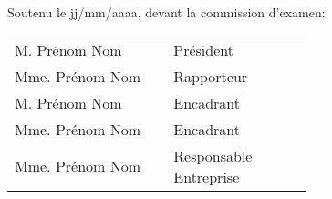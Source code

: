 \begin{titlepage}
\begin{center}
\vspace{40pt}
Soutenu le jj/mm/aaaa, devant la commission d'examen:\\
\vspace{20pt}
\begin{tabular}{p{0.35\linewidth} p{0.3\linewidth}}
  M. Prénom Nom & Président \\
  Mme. Prénom Nom & Rapporteur\\
  M. Prénom Nom & Encadrant\\
  Mme. Prénom Nom & Encadrant\\
  Mme. Prénom Nom & Responsable Entreprise\\
\end{tabular}


\vfill

\end{center}
\end{titlepage}